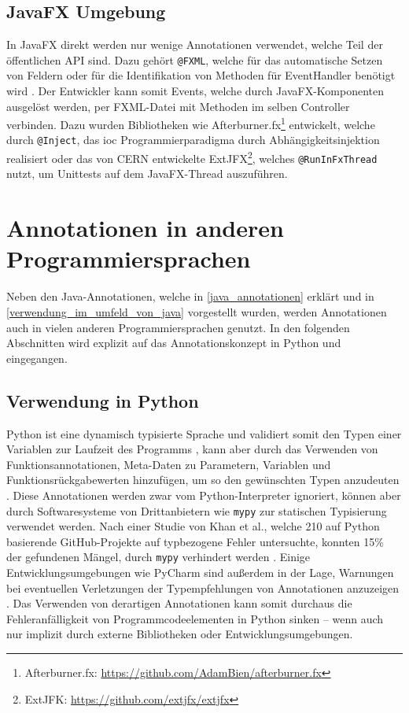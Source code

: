 \subsection{JavaFX Umgebung}
\label{verwendung_im_umfeld_von_java_fx}
In JavaFX direkt werden nur wenige Annotationen verwendet, welche Teil der öffentlichen API sind. Dazu gehört \texttt{@FXML}, welche für das automatische Setzen von Feldern oder für die Identifikation von Methoden für EventHandler benötigt wird \cite{Anderson2019}. Der Entwickler kann somit Events, welche durch JavaFX-Komponenten ausgelöst werden, per FXML-Datei mit Methoden im selben Controller verbinden. Dazu wurden Bibliotheken wie Afterburner.fx\footnote{Afterburner.fx: \url{https://github.com/AdamBien/afterburner.fx}} entwickelt, welche durch \texttt{@Inject}, das \ac{ioc} Programmierparadigma durch Abhängigkeitsinjektion realisiert oder das von CERN entwickelte ExtJFX\footnote{ExtJFK: \url{https://github.com/extjfx/extjfx}}, welches \texttt{@RunInFxThread} nutzt, um Unittests auf dem JavaFX-Thread auszuführen. 

\section{Annotationen in anderen Programmiersprachen}
\label{verwendung_in_anderen_sprachen}
Neben den Java-Annotationen, welche in \autoref{java_annotationen} erklärt und in \autoref{verwendung_im_umfeld_von_java} vorgestellt wurden, werden Annotationen auch in vielen anderen Programmiersprachen genutzt. In den folgenden Abschnitten wird explizit auf das Annotationskonzept in Python und \csharp eingegangen.
\subsection{Verwendung in Python}
\label{verwendung_in_python}
Python ist eine dynamisch typisierte Sprache und validiert somit den Typen einer Variablen zur Laufzeit des Programms \cite{Tratt2009}, kann aber durch das Verwenden von Funktionsannotationen, Meta-Daten zu Parametern, Variablen und Funktionsrückgabewerten hinzufügen, um so den gewünschten Typen anzudeuten \cite{Rossum2014, Winter2006}. Diese Annotationen werden zwar vom Python-Interpreter ignoriert, können aber durch Softwaresysteme von Drittanbietern wie \texttt{mypy} zur statischen Typisierung verwendet werden. Nach einer Studie von Khan et al., welche 210 auf Python basierende GitHub-Projekte auf typbezogene Fehler untersuchte, konnten 15\% der gefundenen Mängel, durch \texttt{mypy} verhindert werden \cite{Khan2021}.
Einige Entwicklungsumgebungen wie PyCharm sind außerdem in der Lage, Warnungen bei eventuellen Verletzungen der Typempfehlungen von Annotationen anzuzeigen \cite{Rother2017}. Das Verwenden von derartigen Annotationen kann somit durchaus die Fehleranfälligkeit von Programmcodeelementen in Python sinken -- wenn auch nur implizit durch externe Bibliotheken oder Entwicklungsumgebungen.

